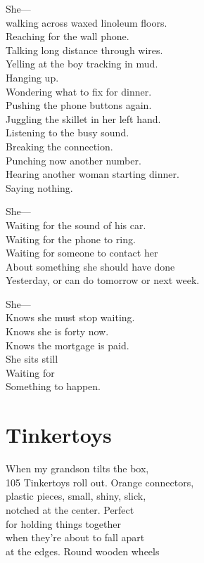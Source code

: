 \documentclass[twoside,10pt]{book}
\begin{document}
She---\\
walking across waxed linoleum floors.\\
Reaching for the wall phone.\\
Talking long distance through wires.\\
Yelling at the boy tracking in mud.\\
Hanging up.\\
Wondering what to fix for dinner.\\
Pushing the phone buttons again.\\
Juggling the skillet in her left hand.\\
Listening to the busy sound.\\
Breaking the connection.\\
Punching now another number.\\
Hearing another woman starting dinner.\\
Saying nothing.

She---\\
Waiting for the sound of his car.\\
Waiting for the phone to ring.\\
Waiting for someone to contact her\\
About something she should have done\\
Yesterday, or can do tomorrow or next week.

She---\\
Knows she must stop waiting.\\
Knows she is forty now.\\
Knows the mortgage is paid.\\
She sits still\\
Waiting for\\
Something to happen.


\clearpage
\section{Tinkertoys}

When my grandson tilts the box,\\
105 Tinkertoys roll out. Orange connectors,\\
plastic pieces, small, shiny, slick,\\
notched at the center. Perfect\\
for holding things together\\
when they're about to fall apart\\
at the edges. Round wooden wheels
\end{document}
